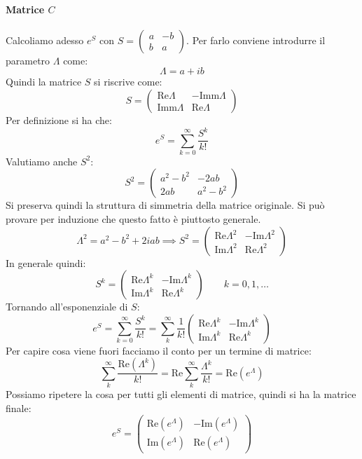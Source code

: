 \paragraph{Matrice $C$}%
Calcoliamo adesso $e^{S}$ con $S=\begin{pmatrix} a & -b \\ b & a \end{pmatrix}$. Per farlo conviene introdurre il parametro $\Lambda$ come:
\[
    \Lambda  = a + ib
\] 
Quindi la matrice $S$  si riscrive come:
\[
    S = \begin{pmatrix} \text{Re}\Lambda  & - \text{Imm}\Lambda  \\ \text{Imm}\Lambda  & \text{Re}\Lambda\end{pmatrix} 
\] 
Per definizione si ha che:
\[
    e^S = \sum_{k=0}^{\infty} \frac{S^k}{k!}
\] 
Valutiamo anche $S^2$:
\[
    S^{2} = \begin{pmatrix} a^2-b^2 & -2ab \\ 2ab & a^2-b^2 \end{pmatrix} 
\] 
Si preserva quindi la struttura di simmetria della matrice originale. Si può provare per induzione che questo fatto è piuttosto generale.
\[
    \Lambda^2=a^2-b^2+2iab \implies  S^2 = 
    \begin{pmatrix} \text{Re}\Lambda^2 & -\text{Im}\Lambda^2 \\ \text{Im}\Lambda^2 & \text{Re}\Lambda^2\end{pmatrix} 
\] 
In generale quindi:
\[
    S^k = 
    \begin{pmatrix} \text{Re}\Lambda^k & -\text{Im}\Lambda^k \\ \text{Im}\Lambda^k & \text{Re}\Lambda^k\end{pmatrix} \qquad 
    k = 0, 1, \ldots
\] 
Tornando all'esponenziale di $S$:
\[
    e^S = \sum_{k=0}^{\infty} \frac{S^k}{k!} = \sum_{k}^{\infty} \frac{1}{k!}
    \begin{pmatrix} \text{Re}\Lambda^k & -\text{Im}\Lambda^k \\ \text{Im}\Lambda^k & \text{Re}\Lambda^k\end{pmatrix}
\] 
Per capire cosa viene fuori facciamo il conto per un termine di matrice:
\[
    \sum_{k}^{\infty} \frac{\text{Re}(\Lambda^k)}{k!} = \text{Re}\sum_{k}^{\infty} \frac{\Lambda^k}{k!} =
    \text{Re}(e^\Lambda )
\] 
Possiamo ripetere la cosa per tutti gli elementi di matrice, quindi si ha la matrice finale:
\[
    e^S = \begin{pmatrix} \text{Re}(e^\Lambda) & - \text{Im}(e^\Lambda) \\ \text{Im}(e^\Lambda) & \text{Re}(e^\Lambda) \end{pmatrix} 
\] 
